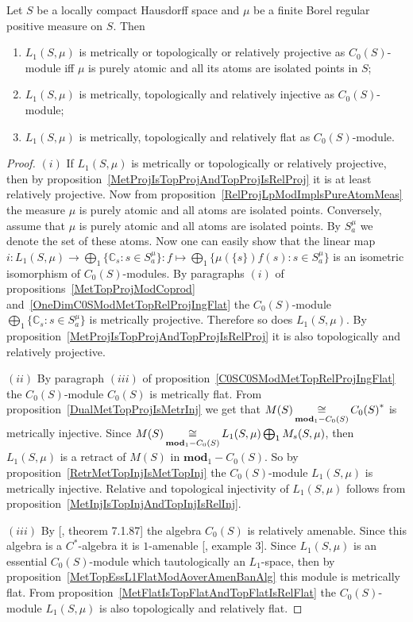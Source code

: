 \begin{proposition}\label{L1C0SModMetTopRelProjInjFlat} Let $S$ be a locally
compact Hausdorff space and $\mu$ be a finite Borel regular positive measure on
$S$. Then 

\begin{enumerate}[label = (\roman*)]
    \item $L_1(S,\mu)$ is metrically or topologically or relatively projective 
    as $C_0(S)$-module iff $\mu$ is purely atomic and all its atoms are 
    isolated points in $S$;

    \item $L_1(S,\mu)$ is metrically, topologically and relatively injective as
    $C_0(S)$-module;

    \item $L_1(S,\mu)$ is metrically, topologically and relatively flat as
    $C_0(S)$-module.
\end{enumerate}
\end{proposition}
\begin{proof} $(i)$ If $L_1(S,\mu)$ is metrically or topologically or relatively
projective, then by proposition~\ref{MetProjIsTopProjAndTopProjIsRelProj} it is
at least relatively projective. Now from
proposition~\ref{RelProjLpModImplsPureAtomMeas} the measure $\mu$ is purely
atomic and all atoms are isolated  points. Conversely, assume that $\mu$ is
purely atomic and all atoms are isolated points. By $S_a^{\mu}$ we denote the
set of these atoms. Now one can easily show that the linear map
$i:L_1(S,\mu)\to\bigoplus_1 \{\mathbb{C}_s:s\in S_a^{\mu} \}:f\mapsto
\bigoplus_1 \{\mu( \{s \})f(s):s\in S_a^{\mu} \}$ is an isometric isomorphism of
$C_0(S)$-modules. By paragraphs $(i)$ of propositions~\ref{MetTopProjModCoprod}
and~\ref{OneDimC0SModMetTopRelProjIngFlat} the $C_0(S)$-module $\bigoplus_1
\{\mathbb{C}_s:s\in S_a^{\mu} \}$ is metrically projective. Therefore so does
$L_1(S,\mu)$. By proposition~\ref{MetProjIsTopProjAndTopProjIsRelProj} it is
also topologically and relatively projective.

$(ii)$ By paragraph $(iii)$ of proposition~\ref{C0SC0SModMetTopRelProjIngFlat} 
the $C_0(S)$-module $C_0(S)$ is metrically flat. From
proposition~\ref{DualMetTopProjIsMetrInj} we get that
$M(S)\mathop{\mathbin{\cong}}\limits_{\mathbf{mod}_1-C_0(S)}{C_0(S)}^*$ is metrically injective. Since
$M(S)\mathop{\mathbin{\cong}}\limits_{\mathbf{mod}_1-C_0(S)}L_1(S,\mu)\bigoplus_1 M_s(S,\mu)$, then
$L_1(S,\mu)$ is a retract of $M(S)$ in $\mathbf{mod}_1-C_0(S)$. So by
proposition~\ref{RetrMetTopInjIsMetTopInj} the $C_0(S)$-module $L_1(S,\mu)$ is
metrically injective. Relative and topological injectivity of $L_1(S,\mu)$
follows from proposition~\ref{MetInjIsTopInjAndTopInjIsRelInj}.

$(iii)$ By [\cite{HelBanLocConvAlg}, theorem 7.1.87] the algebra $C_0(S)$ is
relatively amenable. Since this algebra is a $C^*$-algebra it is $1$-amenable
[\cite{RundeAmenConstFour}, example 3]. Since $L_1(S,\mu)$ is an essential
$C_0(S)$-module which tautologically an $L_1$-space, then by
proposition~\ref{MetTopEssL1FlatModAoverAmenBanAlg} this module is metrically
flat. From proposition~\ref{MetFlatIsTopFlatAndTopFlatIsRelFlat} the
$C_0(S)$-module $L_1(S,\mu)$ is also topologically and relatively flat.
\end{proof}

